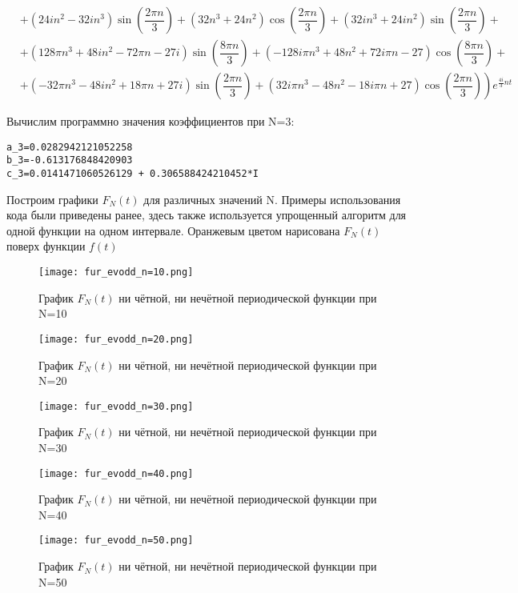 \documentclass[a4paper, 16pt]{article}
\begin{document}
\begin{align*}
    & +\left(24in^2-32in^3\right)\sin\left(\dfrac{2{\pi}n}{3}\right)+\left(32n^3+24n^2\right)\cos\left(\dfrac{2{\pi}n}{3}\right)+\left(32in^3+24in^2\right)\sin\left(\dfrac{2{\pi}n}{3}\right)+\\
    & +\left(128{\pi}n^3+48in^2-72{\pi}n-27i\right)\sin\left(\dfrac{8{\pi}n}{3}\right)+\left(-128i{\pi}n^3+48n^2+72i{\pi}n-27\right)\cos\left(\dfrac{8{\pi}n}{3}\right)+\\
    & \left.+\left(-32{\pi}n^3-48in^2+18{\pi}n+27i\right)\sin\left(\dfrac{2{\pi}n}{3}\right)+\left(32i{\pi}n^3-48n^2-18i{\pi}n+27\right)\cos\left(\dfrac{2{\pi}n}{3}\right)\right)e^{\frac{4i}{3}nt}
\end{align*}


\newpage
\noindent Вычислим программно значения коэффициентов при N=3:
\begin{lstlisting}
a_3=0.0282942121052258
b_3=-0.613176848420903
c_3=0.0141471060526129 + 0.306588424210452*I
\end{lstlisting}


\noindent Построим графики $F_N(t)$ для различных значений N. Примеры использования кода были
приведены ранее, здесь также используется упрощенный алгоритм для одной функции на одном интервале.
Оранжевым цветом нарисована $F_N(t)$ поверх функции $f(t)$
\begin{figure}[!htb]
    \centering
    \texttt{[image: fur\_evodd\_n=10.png]}
    \captionsetup{skip=0pt}
    \caption{График $F_N(t)$ ни чётной, ни нечётной периодической функции при N=10}
    \label{Рис:30}
\end{figure}
\begin{figure}[!htb]
    \centering
    \texttt{[image: fur\_evodd\_n=20.png]}
    \captionsetup{skip=0pt}
    \caption{График $F_N(t)$ ни чётной, ни нечётной периодической функции при N=20}
    \label{Рис:31}
\end{figure}
\newpage
\vspace*{10mm}
\begin{figure}[!htb]
    \centering
    \texttt{[image: fur\_evodd\_n=30.png]}
    \captionsetup{skip=0pt}
    \caption{График $F_N(t)$ ни чётной, ни нечётной периодической функции при N=30}
    \label{Рис:32}
\end{figure}
\begin{figure}[!htb]
    \centering
    \texttt{[image: fur\_evodd\_n=40.png]}
    \captionsetup{skip=0pt}
    \caption{График $F_N(t)$ ни чётной, ни нечётной периодической функции при N=40}
    \label{Рис:33}
\end{figure}
\newpage
\begin{figure}[!htb]
    \centering
    \texttt{[image: fur\_evodd\_n=50.png]}
    \captionsetup{skip=0pt}
    \caption{График $F_N(t)$ ни чётной, ни нечётной периодической функции при N=50}
    \label{Рис:34}
\end{figure}
\end{document}
